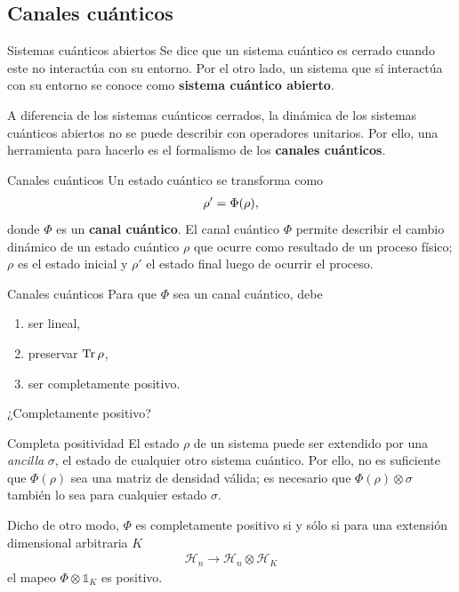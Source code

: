 \documentclass[11pt]{beamer}
\begin{document}
\subsection{Canales cuánticos}

\begin{frame}{Sistemas cuánticos abiertos}
Se dice que un sistema cuántico es cerrado cuando este no interactúa con su
entorno. Por el otro lado, un sistema que sí interactúa con su 
entorno se conoce como \textbf{sistema cuántico abierto}. \vfill

A diferencia de los sistemas cuánticos cerrados, la dinámica de los sistemas
cuánticos abiertos no se puede describir con operadores unitarios. Por ello,
una herramienta para hacerlo es el formalismo
de los \textbf{canales cuánticos}. 
\end{frame}

\begin{frame}{Canales cuánticos}
Un estado cuántico se transforma como
\begin{align}
	\rho ' = \Phi \qty(\rho),
\end{align}
donde $\Phi$ es un \textbf{canal cuántico}. El canal cuántico $\Phi$
permite describir el cambio dinámico de un estado cuántico $\rho$ 
que ocurre como resultado de un proceso físico; $\rho$ es el estado inicial
y $\rho'$ el estado final luego de ocurrir el proceso.
\end{frame}

\begin{frame}{Canales cuánticos}
Para que $\Phi$ sea un canal cuántico, debe
\begin{enumerate}
	\item ser lineal,
	\item preservar $\Tr \rho$,
	\item ser completamente positivo.
\end{enumerate}\vfill
¿Completamente positivo? 
\end{frame}


\begin{frame}{Completa positividad}
	El estado $\rho$ de un sistema puede ser extendido por una \emph{ancilla}
	$\sigma$, el estado de cualquier otro sistema cuántico. Por ello, no es
	suficiente que $\Phi (\rho)$ sea una matriz de densidad válida; es 
	necesario que $\Phi (\rho) \otimes \sigma$ también lo sea para cualquier
	estado $\sigma$.\vfill
	
	Dicho de otro modo, $\Phi$ es completamente positivo si y sólo si para una
	extensión dimensional arbitraria $K$
	\begin{align*}
		\mathcal{H}_n \rightarrow \mathcal{H}_n\otimes \mathcal{H}_K
	\end{align*}
	el mapeo $\Phi\otimes \mathbb{1}_K$ es positivo.
\end{frame}
\end{document}
